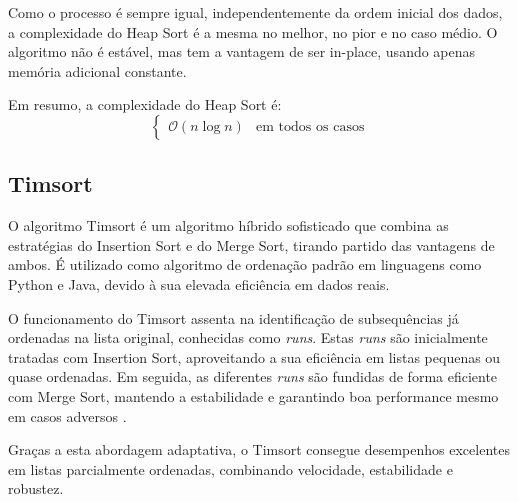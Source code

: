 \documentclass[conference]{IEEEtran}
\begin{document}
Como o processo é sempre igual, independentemente da ordem inicial dos dados, a complexidade do Heap Sort é a mesma no melhor, no pior e no caso médio. O algoritmo não é estável, mas tem a vantagem de ser in-place, usando apenas memória adicional constante.

Em resumo, a complexidade do Heap Sort é:
\[
\begin{cases}
\mathcal{O}(n \log n) & \text{em todos os casos}
\end{cases}
\]

\subsection{Timsort}

O algoritmo Timsort é um algoritmo híbrido sofisticado que combina as estratégias do Insertion Sort e do Merge Sort, tirando partido das vantagens de ambos. É utilizado como algoritmo de ordenação padrão em linguagens como Python e Java, devido à sua elevada eficiência em dados reais.

O funcionamento do Timsort assenta na identificação de subsequências já ordenadas na lista original, conhecidas como \textit{runs}. Estas \textit{runs} são inicialmente tratadas com Insertion Sort, aproveitando a sua eficiência em listas pequenas ou quase ordenadas. Em seguida, as diferentes \textit{runs} são fundidas de forma eficiente com Merge Sort, mantendo a estabilidade e garantindo boa performance mesmo em casos adversos \cite{auger2019worstcasecomplexitytimsort}.

Graças a esta abordagem adaptativa, o Timsort consegue desempenhos excelentes em listas parcialmente ordenadas, combinando velocidade, estabilidade e robustez.
\end{document}
